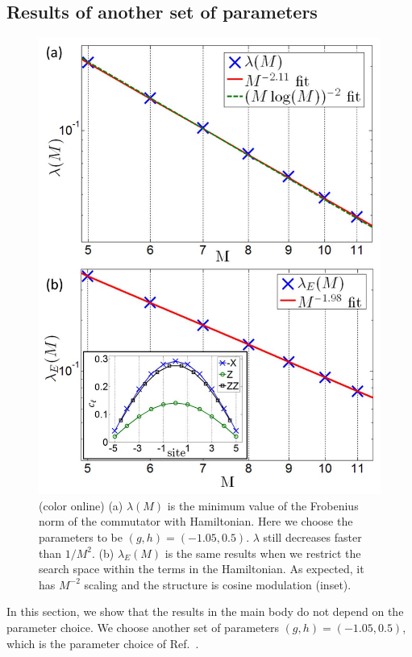 \documentclass[twocolumn,superscriptaddress, prl,showpacs]{revtex4-1}
\begin{document}
\subsection{Results of another set of parameters}
\begin{figure}
\includegraphics[width=1.0\linewidth]{fig_hamiltonian_other.pdf}
\centering
\caption{(color online) (a) $\lambda(M)$ is the minimum value of the Frobenius norm of the commutator with Hamiltonian.
Here we choose the parameters to be $(g,h) = (-1.05, 0.5)$. $\lambda$ still decreases faster than $1/M^2$.
(b) $\lambda_E(M)$ is the same results when we restrict the search space within the terms in the Hamiltonian.
As expected, it has $M^{-2}$ scaling and the structure is cosine modulation (inset).}
\label{fig:hamiltonian_other}
\end{figure}
In this section, we show that the results in the main body do not depend on the parameter choice.
We choose another set of parameters $(g,h) = (-1.05, 0.5)$, which is the parameter choice of Ref.~.
\end{document}
